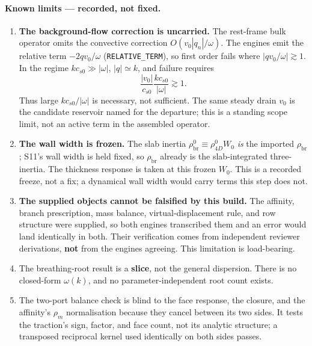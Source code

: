 \paragraph{Known limits --- recorded, not fixed.}
\begin{enumerate}[leftmargin=2.2em]
\item \textbf{The background-flow correction is uncarried.} The rest-frame
bulk operator omits the convective correction
\(O(v_0|q_n|/\omega)\). The engines emit the relative term
\(-2qv_0/\omega\) (\texttt{RELATIVE\_TERM}), so first order fails where
\(|qv_0/\omega|\gtrsim1\). In the regime \(kc_{s0}\gg|\omega|\),
\(|q|\simeq k\), and failure requires
\[
  \frac{|v_0|}{c_{s0}}\frac{kc_{s0}}{|\omega|}\gtrsim1.
\]
Thus large \(kc_{s0}/|\omega|\) is necessary, not sufficient. The same steady
drain \(v_0\) is the candidate reservoir named for the departure; this is a
standing scope limit, not an active term in the assembled operator.

\item \textbf{The wall width is frozen.} The slab inertia
\(\rho_{\mathrm{br}}^0\equiv\rho_{4D}^0 W_0\) \emph{is} the imported
\(\rho_{\mathrm{br}}\); S11's wall width is held fixed, so \(\rho_{\mathrm{br}}\)
already is the slab-integrated three-inertia. The thickness response is taken at
this frozen \(W_0\). This is a recorded freeze, not a fix; a dynamical wall width
would carry terms this step does not.

\item \textbf{The supplied objects cannot be falsified by this build.} The
affinity, branch prescription, mass balance, virtual-displacement rule, and row
structure were supplied, so both engines transcribed them and an error would
land identically in both. Their verification comes from independent reviewer
derivations, \textbf{not} from the engines agreeing. This limitation is
load-bearing.

\item The breathing-root result is a \textbf{slice}, not the general
dispersion. There is no closed-form \(\omega(k)\), and no parameter-independent
root count exists.

\item The two-port balance check is blind to the face response, the closure,
and the affinity's \(\rho_m\) normalisation because they cancel between its two
sides. It tests the traction's sign, factor, and face count, not its analytic
structure; a transposed reciprocal kernel used identically on both sides
passes.


\end{enumerate}
